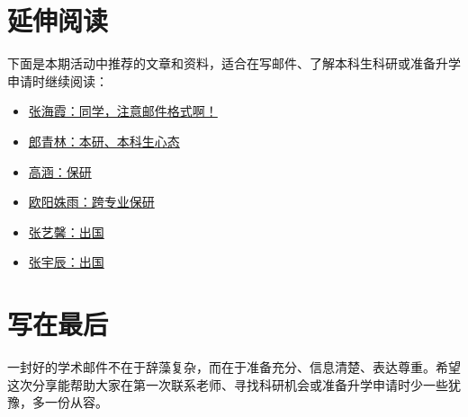 \section{延伸阅读}

下面是本期活动中推荐的文章和资料，适合在写邮件、了解本科生科研或准备升学申请时继续阅读：

\begin{itemize}
\item \href{https://mp.weixin.qq.com/s/tjWFu6cLGwFmV1P91v8n7w}{张海霞：同学，注意邮件格式啊！}
\item \href{https://mp.weixin.qq.com/s/fwuviFt3tKGyfcXokMVTcg}{郎青林：本研、本科生心态}
\item \href{https://mp.weixin.qq.com/s/ap1fRs7ow2gxftS7byXAew}{高涵：保研}
\item \href{https://mp.weixin.qq.com/s/D-J4XQhenURe5ER0wwwmyw}{欧阳姝雨：跨专业保研}
\item \href{https://mp.weixin.qq.com/s/bN1ak8ItBLVLdy5ansyXZQ}{张艺馨：出国}
\item \href{https://mp.weixin.qq.com/s/kPczi0jLFKu8NW0hnZJqBw}{张宇辰：出国}
\end{itemize}

\section{写在最后}

一封好的学术邮件不在于辞藻复杂，而在于准备充分、信息清楚、表达尊重。希望这次分享能帮助大家在第一次联系老师、寻找科研机会或准备升学申请时少一些犹豫，多一份从容。
